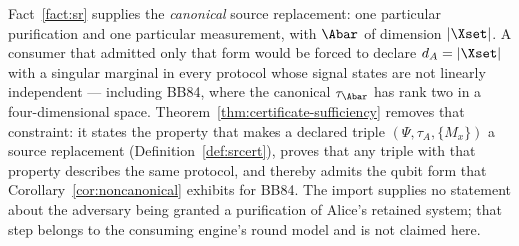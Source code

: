 
\begin{remark}\label{rem:import}
Fact~\ref{fact:sr} supplies the \emph{canonical} source replacement: one
particular purification and one particular measurement, with $\Abar$ of
dimension $|\Xset|$. A consumer that admitted only that form would be
forced to declare $d_A=|\Xset|$ with a singular marginal in every protocol
whose signal states are not linearly independent --- including BB84, where
the canonical $\tau_{\Abar}$ has rank two in a four-dimensional space.
Theorem~\ref{thm:certificate-sufficiency} removes that constraint: it states the property that
makes a declared triple $(\Psi,\tau_A,\{M_x\})$ a source replacement
(Definition~\ref{def:srcert}), proves that any triple with that property
describes the same protocol, and thereby admits the qubit form that
Corollary~\ref{cor:noncanonical} exhibits for BB84. The import supplies no
statement about the adversary being granted a purification of Alice's
retained system; that step belongs to the consuming engine's round model and
is not claimed here.
\end{remark}
